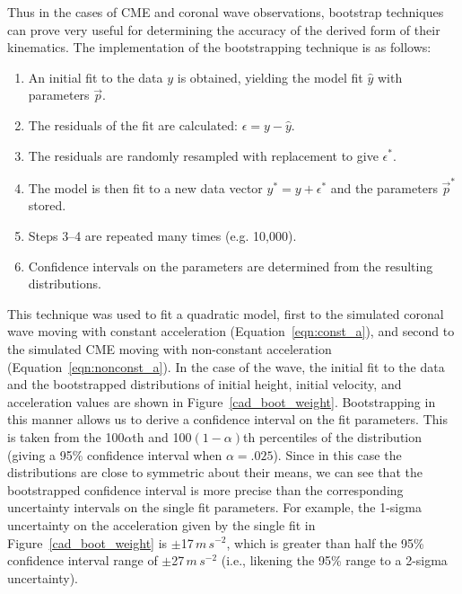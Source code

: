 \documentclass[structabstract]{aa}
\begin{document}
Thus in the cases of CME and coronal wave observations, bootstrap techniques can prove very useful for determining the accuracy of the derived form of their kinematics. The implementation of the bootstrapping technique is as follows:
\begin{enumerate}
\item An initial fit to the data $y$ is obtained, yielding the model fit $\hat{y}$ with parameters $\vec{p}$.
\item The residuals of the fit are calculated: $\epsilon = y - \hat{y}$.
\item The residuals are randomly resampled with replacement to give $\epsilon^*$.
\item The model is then fit to a new data vector $y^* = y + \epsilon^*$ and the parameters $\vec{p}^*$ stored.
\item Steps 3--4 are repeated many times (e.g. 10,000).
\item Confidence intervals on the parameters are determined from the resulting distributions.
\end{enumerate}
This technique was used to fit a quadratic model, first to the simulated coronal wave moving with constant acceleration (Equation~\ref{eqn:const_a}), and second to the simulated CME moving with non-constant acceleration (Equation~\ref{eqn:nonconst_a}). In the case of the wave, the initial fit to the data and the bootstrapped distributions of initial height, initial velocity, and acceleration values are shown in Figure~\ref{cad_boot_weight}. Bootstrapping in this manner allows us to derive a confidence interval on the fit parameters. This is taken from the 100$\alpha$th and 100$\left(1-\alpha\right)$th percentiles of the distribution (giving a 95\% confidence interval when $\alpha=.025$). Since in this case the distributions are close to symmetric about their means, we can see that the bootstrapped confidence interval is more precise than the corresponding uncertainty intervals on the single fit parameters. For example, the 1-sigma uncertainty on the acceleration given by the single fit in Figure~\ref{cad_boot_weight} is $\pm$17$\,m\,s^{-2}$, which is greater than half the 95\% confidence interval range of $\pm$27$\,m\,s^{-2}$ (i.e., likening the 95\% range to a 2-sigma uncertainty). 
\end{document}
